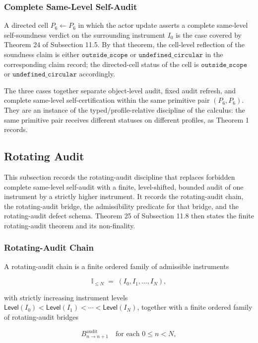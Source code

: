 \documentclass[11pt]{article}
\theoremstyle{definition}
\begin{document}
\subsubsection{Complete Same-Level Self-Audit}

A directed cell \(P_6\leftarrow P_6\) in which the actor update asserts a complete same-level self-soundness verdict on the surrounding instrument \(I_0\) is the case covered by Theorem 24 of Subsection 11.5. By that theorem, the cell-level reflection of the soundness claim is either \(\texttt{outside\_scope}\) or \(\texttt{undefined\_circular}\) in the corresponding claim record; the directed-cell status of the cell is \(\texttt{outside\_scope}\) or \(\texttt{undefined\_circular}\) accordingly.

The three cases together separate object-level audit, fixed audit refresh, and complete same-level self-certification within the same primitive pair \((P_6,P_6)\). They are an instance of the typed/profile-relative discipline of the calculus: the same primitive pair receives different statuses on different profiles, as Theorem 1 records.

\subsection{Rotating Audit}

This subsection records the rotating-audit discipline that replaces forbidden complete same-level self-audit with a finite, level-shifted, bounded audit of one instrument by a strictly higher instrument. It records the rotating-audit chain, the rotating-audit bridge, the admissibility predicate for that bridge, and the rotating-audit defect schema. Theorem 25 of Subsection 11.8 then states the finite rotating-audit theorem and its non-finality.

\subsubsection{Rotating-Audit Chain}

A rotating-audit chain is a finite ordered family of admissible instruments

\[
\mathbb I_{\le N}\;=\;(I_0,I_1,\ldots,I_N),
\]

with strictly increasing instrument levels \(\mathsf{Level}(I_0)<\mathsf{Level}(I_1)<\cdots<\mathsf{Level}(I_N)\), together with a finite ordered family of rotating-audit bridges

\[
B^{\mathrm{audit}}_{n\to n+1}\quad\text{for each } 0\le n<N,
\]
\end{document}
